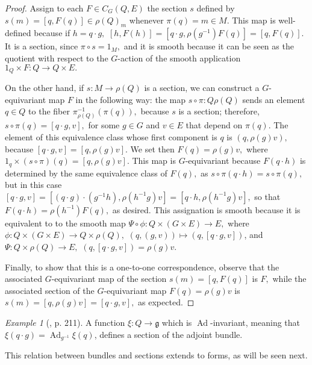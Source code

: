 \documentclass[12pt, letterpaper, reqno]{amsart}
\theoremstyle{definition}
\theoremstyle{plain}
\theoremstyle{remark}
\newtheorem{ex}{Example}
\begin{document}
\begin{proof}
	Assign to each $ F\in C_G(Q,E) $ the section $s $ defined by $s(m)=[q, F(q)]\in \rho(Q)_m $ whenever $ \pi(q)=m\in M. $  This map is well-defined because if $ h= q\cdot g, $ $ [h,F(h)]=[q\cdot g, \rho(g^{-1})F(q)]=[q,F(q)]$. It is a section, since $ \pi\circ s = 1_M, $ and it is smooth because it can be seen as the quotient with respect to the $ G $-action of the smooth application $ 1_Q\times F: Q \rightarrow Q\times E. $ 

	On the other hand, if $s: M \rightarrow \rho(Q)$ is a section, we can construct a $ G $-equivariant map $ F $ in the following way: the map $ s\circ\pi: Q \rho(Q) $ sends an element $ q\in Q $ to the fiber $ \pi_{ \rho(Q)}^{-1}(\pi(q)), $ because $ s $ is a section; therefore, $ s\circ \pi(q)=[q\cdot g, v], $ for some $ g\in G $ and $ v\in E $ that depend on $ \pi(q). $ The element of this equivalence class whose first component is $ q $ is $ (q,\rho(g)v), $ because $ [q\cdot g, v] = [q,\rho(g)v]$. We set then $ F(q)=\rho(g)v, $ where $ 1_q\times(s\circ\pi)(q)=[q,\rho(g)v]. $ This map is $ G $-equivariant because $ F(q\cdot h) $ is determined by the same equivalence class of $ F(q), $ as $ s\circ\pi(q\cdot h)= s\circ \pi(q), $ but in this case $ [q\cdot g, v] = [(q\cdot g)\cdot(g^{-1}h), \rho(h^{-1}g)v] = [q\cdot h, \rho(h^{-1}g)v], $ so that $ F(q\cdot h) = \rho(h^{-1})F(q), $ as desired. This assignation is smooth because it is equivalent to to the smooth map $ \Psi\circ \phi: Q\times(G\times E) \rightarrow E,$ where $ \phi: Q \times(G\times E) \rightarrow Q\times \rho(Q), $ $ (q,(g,v)) \mapsto (q, [q\cdot g, v]) $, and $ \Psi: Q\times \rho(Q) \rightarrow E, $ $ (q,[q\cdot g, v])=\rho(g)v. $    

	Finally, to show that this is a one-to-one correspondence, observe that the associated $ G $-equivariant map of the section $ s(m)=[q, F(q)] $ is $ F, $  while the associated section of the $ G $-equivariant map $ F(q)=\rho(g) v $ is $ s(m)=[q,\rho(g)v]=[q\cdot g, v], $ as expected.
\end{proof}

\begin{ex}[\cite{montgomery2002tour}, p. 211]
	A function $ \xi: Q \rightarrow \mathfrak{g}  $ which is $ \operatorname{Ad}  $-invariant, meaning that $ \xi(q\cdot g)= \operatorname{Ad}_{g^{-1}}\xi(q) $, defines a section of the adjoint bundle. 
\end{ex}

This relation between bundles and sections extends to forms, as will be seen next.
\end{document}
